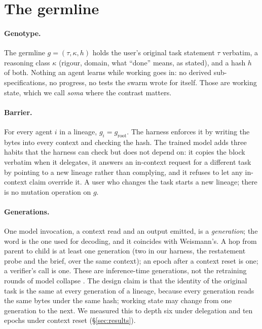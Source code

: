\documentclass[11pt]{article}
\begin{document}
\section{The germline}\label{sec:germline}

\paragraph{Genotype.} The germline $g=(\tau,\kappa,h)$ holds the user's original task statement $\tau$ verbatim, a reasoning class $\kappa$ (rigour, domain, what ``done'' means, as stated), and a hash $h$ of both. Nothing an agent learns while working goes in: no derived sub-specifications, no progress, no tests the swarm wrote for itself. Those are working state, which we call \emph{soma} where the contrast matters.

\paragraph{Barrier.} For every agent $i$ in a lineage, $g_i=g_{\text{root}}$. The harness enforces it by writing the bytes into every context and checking the hash. The trained model adds three habits that the harness can check but does not depend on: it copies the block verbatim when it delegates, it answers an in-context request for a different task by pointing to a new lineage rather than complying, and it refuses to let any in-context claim override it. A user who changes the task starts a new lineage; there is no mutation operation on $g$.

\paragraph{Generations.} One model invocation, a context read and an output emitted, is a \emph{generation}; the word is the one used for decoding, and it coincides with Weismann's. A hop from parent to child is at least one generation (two in our harness, the restatement probe and the brief, over the same context); an epoch after a context reset is one; a verifier's call is one. These are inference-time generations, not the retraining rounds of model collapse \citep{shumailov2024}. The design claim is that the identity of the original task is the same at every generation of a lineage, because every generation reads the same bytes under the same hash; working state may change from one generation to the next. We measured this to depth six under delegation and ten epochs under context reset (\S\ref{sec:results}).
\end{document}
